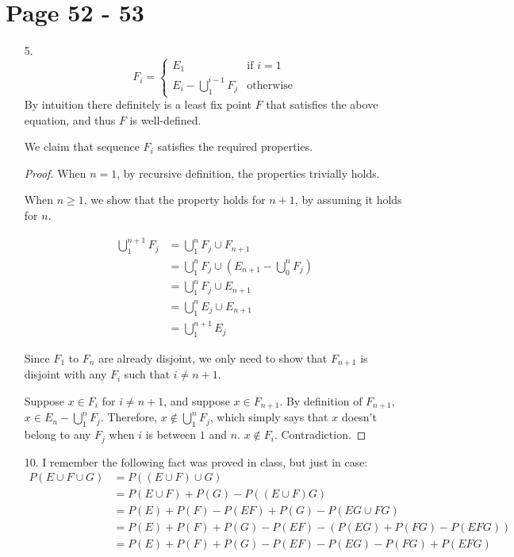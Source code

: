 \documentclass{article}
\begin{document}
\section*{Page 52 - 53}
\begin{itemize}
\item [5.]
  \begin{equation*}
    F_i=\begin{cases}
      E_1 & \text{if $i=1$}\\
      E_i - \bigcup_{1}^{i-1}F_j & \text{otherwise}
    \end{cases}
  \end{equation*}
  By intuition there definitely is a least fix point $F$ that
satisfies the above equation, and thus $F$ is well-defined.
  
  We claim that sequence $F_i$ satisfies the required properties.
  \begin{proof}
    When $n=1$, by recursive definition, the properties trivially
    holds.

    When $n\geq 1$, we show that the property holds for $n+1$,
    by assuming it holds for $n$.
    
    \begin{equation*}
      \begin{split}
        \bigcup_{1}^{n+1}F_j
        &= \bigcup_{1}^{n}F_j \cup F_{n+1} \\
        &= \bigcup_{1}^{n}F_j \cup (E_{n+1} - \bigcup_{0}^{n}F_j)\\
        &= \bigcup_{1}^{n}F_j \cup E_{n+1}\\
        &= \bigcup_{1}^{n}E_j \cup E_{n+1}\\
        &= \bigcup_{1}^{n+1}E_j
      \end{split}
    \end{equation*}

    Since $F_1$ to $F_n$ are already disjoint, we only need to show
    that $F_{n+1}$ is disjoint with any $F_i$ such that $i\neq n+1$.

    Suppose $x \in F_i$ for $i \neq
    n+1$, and suppose $x \in F_{n+1}$. By definition of $F_{n+1}$, $x
    \in E_n-\bigcup_{1}^{n}F_j$. Therefore, $x \notin
    \bigcup_{1}^{n}F_j$, which simply says that $x$ doesn't belong to
    any $F_j$ when $i$ is between $1$ and $n$. $x \notin F_i$. Contradiction.
  \end{proof}
\item [10.]
  I remember the following fact was proved in class, but just in case:
  \begin{equation*}
    \begin{split}
      P(E \cup F \cup G)
      &= P ((E \cup F) \cup G) \\
      &= P(E \cup F) + P(G) - P((E\cup F) G)\\
      &= P(E) + P(F) - P(EF) + P(G) - P(EG \cup FG) \\
      &= P(E) + P(F) + P(G) - P(EF) - (P(EG) + P(FG) - P(EFG))\\
      &= P(E) + P(F) + P(G) - P(EF) - P(EG) - P(FG) + P(EFG)\\
    \end{split}
  \end{equation*}


\end{itemize}
\end{document}
